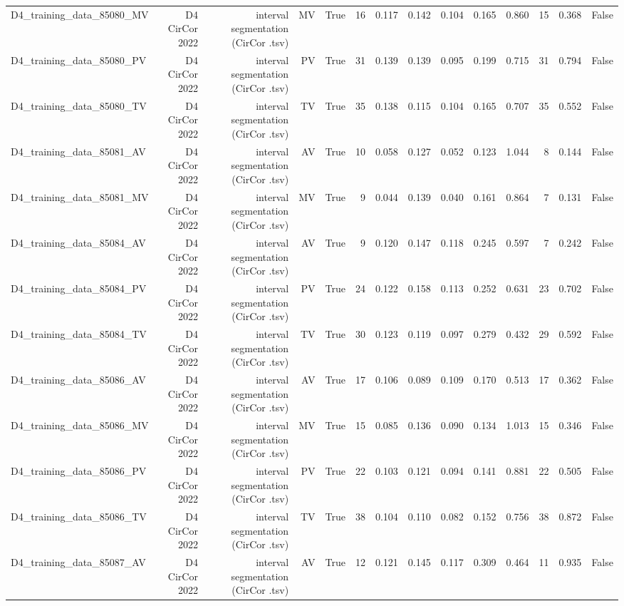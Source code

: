 \begin{table}[htbp]
\begin{tabular}{lrrrrrrrrrrrrr}
    D4\_training\_data\_85080\_MV & D4 CirCor 2022 & interval segmentation (CirCor .tsv) & MV & True & 16 & 0.117 & 0.142 & 0.104 & 0.165 & 0.860 & 15 & 0.368 & False \\
    D4\_training\_data\_85080\_PV & D4 CirCor 2022 & interval segmentation (CirCor .tsv) & PV & True & 31 & 0.139 & 0.139 & 0.095 & 0.199 & 0.715 & 31 & 0.794 & False \\
    D4\_training\_data\_85080\_TV & D4 CirCor 2022 & interval segmentation (CirCor .tsv) & TV & True & 35 & 0.138 & 0.115 & 0.104 & 0.165 & 0.707 & 35 & 0.552 & False \\
    D4\_training\_data\_85081\_AV & D4 CirCor 2022 & interval segmentation (CirCor .tsv) & AV & True & 10 & 0.058 & 0.127 & 0.052 & 0.123 & 1.044 & 8 & 0.144 & False \\
    D4\_training\_data\_85081\_MV & D4 CirCor 2022 & interval segmentation (CirCor .tsv) & MV & True & 9 & 0.044 & 0.139 & 0.040 & 0.161 & 0.864 & 7 & 0.131 & False \\
    D4\_training\_data\_85084\_AV & D4 CirCor 2022 & interval segmentation (CirCor .tsv) & AV & True & 9 & 0.120 & 0.147 & 0.118 & 0.245 & 0.597 & 7 & 0.242 & False \\
    D4\_training\_data\_85084\_PV & D4 CirCor 2022 & interval segmentation (CirCor .tsv) & PV & True & 24 & 0.122 & 0.158 & 0.113 & 0.252 & 0.631 & 23 & 0.702 & False \\
    D4\_training\_data\_85084\_TV & D4 CirCor 2022 & interval segmentation (CirCor .tsv) & TV & True & 30 & 0.123 & 0.119 & 0.097 & 0.279 & 0.432 & 29 & 0.592 & False \\
    D4\_training\_data\_85086\_AV & D4 CirCor 2022 & interval segmentation (CirCor .tsv) & AV & True & 17 & 0.106 & 0.089 & 0.109 & 0.170 & 0.513 & 17 & 0.362 & False \\
    D4\_training\_data\_85086\_MV & D4 CirCor 2022 & interval segmentation (CirCor .tsv) & MV & True & 15 & 0.085 & 0.136 & 0.090 & 0.134 & 1.013 & 15 & 0.346 & False \\
    D4\_training\_data\_85086\_PV & D4 CirCor 2022 & interval segmentation (CirCor .tsv) & PV & True & 22 & 0.103 & 0.121 & 0.094 & 0.141 & 0.881 & 22 & 0.505 & False \\
    D4\_training\_data\_85086\_TV & D4 CirCor 2022 & interval segmentation (CirCor .tsv) & TV & True & 38 & 0.104 & 0.110 & 0.082 & 0.152 & 0.756 & 38 & 0.872 & False \\
    D4\_training\_data\_85087\_AV & D4 CirCor 2022 & interval segmentation (CirCor .tsv) & AV & True & 12 & 0.121 & 0.145 & 0.117 & 0.309 & 0.464 & 11 & 0.935 & False \\

\end{tabular}
\end{table}
